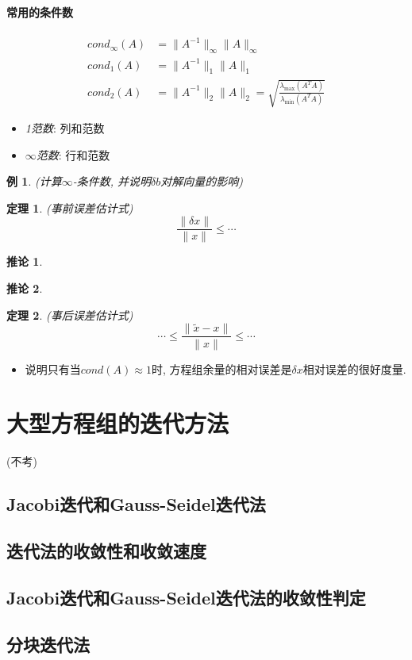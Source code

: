 \documentclass[twoside]{article}
\newtheorem{theorem}{定理}[section]
\newtheorem{corollary}{推论}[section]
\newtheorem{eg}{例}[section]
\begin{document}
\paragraph{常用的条件数}
\begin{equation}
  \begin{aligned}
    cond_\infty(A)&=\|A^{-1}\|_\infty \|A\|_\infty \\
    cond_1(A)&=\|A^{-1}\|_1 \|A\|_1 \\
    cond_2(A)&=\|A^{-1}\|_2 \|A\|_2 = \sqrt{\frac{\lambda_{\max}(A^TA)}{\lambda_{\min}(A^TA)}}
  \end{aligned}
\end{equation}
\begin{itemize}[leftmargin=2em]
  \item \textit{1范数}: 列和范数
  \item \textit{$\infty$范数}: 行和范数
\end{itemize}
\begin{eg}
  (计算$\infty$-条件数, 并说明$\delta b$对解向量的影响)
\end{eg}
\begin{theorem}
  (事前误差估计式)
  \begin{equation}
    \frac{\|\delta x\|}{\|x\|} \le \cdots
  \end{equation}
\end{theorem}
\begin{corollary}
\end{corollary}
\begin{corollary}
\end{corollary}
\begin{theorem}
  (事后误差估计式)
  \begin{equation}
    \cdots \le \frac{\|\tilde{x} - x\|}{\|x\|} \le \cdots
  \end{equation}
\end{theorem}
\begin{itemize}
  \item 说明只有当$cond(A)\approx 1$时, 方程组余量的相对误差是$\delta x$相对误差的很好度量.
\end{itemize}

\section{大型方程组的迭代方法}
(不考)
\subsection{Jacobi迭代和Gauss-Seidel迭代法}
\subsection{迭代法的收敛性和收敛速度}
\subsection{Jacobi迭代和Gauss-Seidel迭代法的收敛性判定}
\subsection{分块迭代法}
\end{document}
